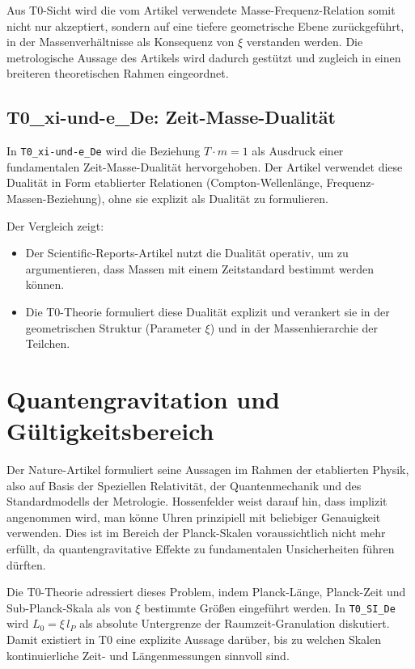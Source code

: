 Aus T0-Sicht wird die vom Artikel verwendete Masse-Frequenz-Relation somit
nicht nur akzeptiert, sondern auf eine tiefere geometrische Ebene zurückgeführt,
in der Massenverhältnisse als Konsequenz von $\xi$ verstanden werden. Die
metrologische Aussage des Artikels wird dadurch gestützt und zugleich in einen
breiteren theoretischen Rahmen eingeordnet.

\subsection{T0\_xi-und-e\_De: Zeit-Masse-Dualität}

In \texttt{T0\_xi-und-e\_De} wird die Beziehung $T\cdot m = 1$ als Ausdruck
einer fundamentalen Zeit-Masse-Dualität hervorgehoben. Der Artikel verwendet
diese Dualität in Form etablierter Relationen (Compton-Wellenlänge,
Frequenz-Massen-Beziehung), ohne sie explizit als Dualität zu formulieren.

Der Vergleich zeigt:
\begin{itemize}
  \item Der Scientific-Reports-Artikel nutzt die Dualität operativ, um zu
        argumentieren, dass Massen mit einem Zeitstandard bestimmt werden
        können.
  \item Die T0-Theorie formuliert diese Dualität explizit und verankert sie in
        der geometrischen Struktur (Parameter $\xi$) und in der Massenhierarchie
        der Teilchen.
\end{itemize}

\section{Quantengravitation und Gültigkeitsbereich}
\label{sec:qg_gueltigkeit}

Der Nature-Artikel formuliert seine Aussagen im Rahmen der etablierten Physik,
also auf Basis der Speziellen Relativität, der Quantenmechanik und des
Standardmodells der Metrologie. Hossenfelder weist darauf hin, dass implizit
angenommen wird, man könne Uhren prinzipiell mit beliebiger Genauigkeit
verwenden. Dies ist im Bereich der Planck-Skalen voraussichtlich nicht mehr
erfüllt, da quantengravitative Effekte zu fundamentalen Unsicherheiten führen
dürften.

Die T0-Theorie adressiert dieses Problem, indem Planck-Länge, Planck-Zeit und
Sub-Planck-Skala als von $\xi$ bestimmte Größen eingeführt werden. In
\texttt{T0\_SI\_De} wird $L_0 = \xi\,l_P$ als absolute Untergrenze der
Raumzeit-Granulation diskutiert. Damit existiert in T0 eine explizite Aussage
darüber, bis zu welchen Skalen kontinuierliche Zeit- und Längenmessungen
sinnvoll sind.

